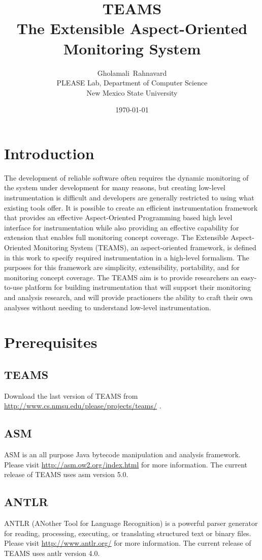 \documentclass{report}
\author{Gholamali\ Rahnavard \\ PLEASE Lab, Department of Computer Science\\New Mexico State University}
\title{{\bf T{\Large EAMS}}\\
{\Large The Extensible Aspect-Oriented Monitoring System}} \date{\today}
\begin{document}
\maketitle
\tableofcontents

\section{Introduction}%
The development of reliable software often requires 
the dynamic monitoring of the system under development 
for many reasons, but creating low-level instrumentation
is difficult and developers are generally restricted to using what
existing tools offer. It is possible to create an efficient instrumentation framework that 
provides an effective Aspect-Oriented Programming based high level interface for instrumentation while also 
providing an effective capability for extension that enables full monitoring concept coverage. The Extensible Aspect-Oriented Monitoring System (TEAMS), 
an aspect-oriented framework, is defined in this work to specify required instrumentation in a high-level formalism. The purposes for this framework are simplicity, extensibility, portability, 
and for monitoring concept coverage. The T{\small EAMS} aim is to provide researchers
an easy-to-use platform for building instrumentation that
will support their monitoring and analysis research, and will
provide practioners the ability to craft their own analyses
without needing to understand low-level instrumentation.

\section{Prerequisites}

\subsection{T{\small EAMS}}
Download the last version of TEAMS from \url{http://www.cs.nmsu.edu/please/projects/teams/} .

\subsection{A{\small SM}}
ASM is an all purpose Java bytecode manipulation and analysis framework. Please visit \url{http://asm.ow2.org/index.html} for more information. The current release of TEAMS uses asm version 5.0.

\subsection{A{\small NTLR}}
ANTLR (ANother Tool for Language Recognition) is a powerful parser generator for reading, processing, executing, or translating structured text or binary files. Please visit \url{http://www.antlr.org/} for more information. The current release of TEAMS uses antlr version 4.0.
\end{document}
